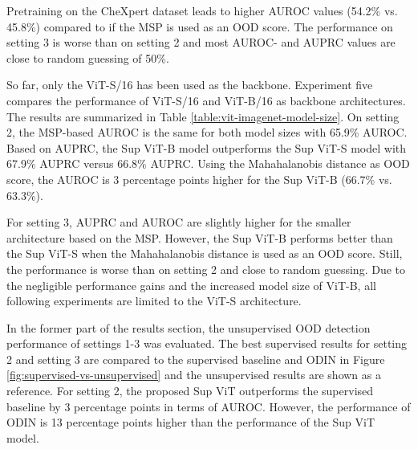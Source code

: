 Pretraining on the CheXpert dataset leads to higher AUROC values (54.2\% vs. 45.8\%) compared to \citep{Berger2021} if the MSP is used as an OOD score. 
The performance on setting 3 is worse than on setting 2 and most AUROC- and AUPRC values are close to random guessing of 50\%.
\par
So far, only the ViT-S/16 has been used as the backbone.
Experiment five compares the performance of ViT-S/16 and ViT-B/16 as backbone architectures.
The results are summarized in Table \ref{table:vit-imagenet-model-size}.
On setting 2, the MSP-based AUROC is the same for both model sizes with 65.9\% AUROC.
Based on AUPRC, the Sup ViT-B model outperforms the Sup ViT-S model with 67.9\% AUPRC versus 66.8\% AUPRC.
Using the Mahahalanobis distance as OOD score, the AUROC is 3 percentage points higher for the Sup ViT-B (66.7\% vs. 63.3\%).
\par
For setting 3, AUPRC and AUROC are slightly higher for the smaller architecture based on the MSP.
However, the Sup ViT-B performs better than the Sup ViT-S when the Mahahalanobis distance is used as an OOD score.
Still, the performance is worse than on setting 2 and close to random guessing.
Due to the negligible performance gains and the increased model size of ViT-B, all following experiments are limited to the ViT-S architecture.
\par
{}
In the former part of the results section, the unsupervised OOD detection performance of settings 1-3 was evaluated.
The best supervised results for setting 2 and setting 3 are compared to the supervised baseline and ODIN in Figure \ref{fig:supervised-vs-unsupervised} and the unsupervised results are shown as a reference.
For setting 2, the proposed Sup ViT outperforms the supervised baseline by 3 percentage points in terms of AUROC.
However, the performance of ODIN is 13 percentage points higher than the performance of the Sup ViT model.
